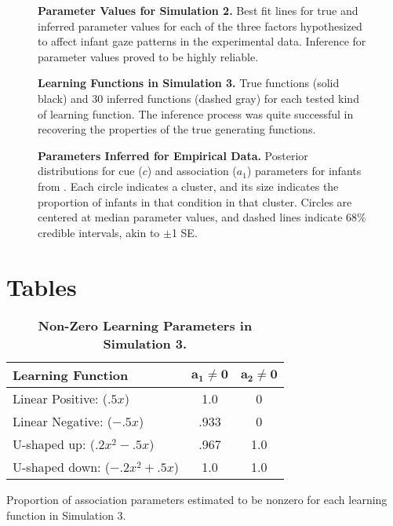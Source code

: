 \documentclass[12pt]{article}
\begin{document}
\begin{figure}[!h]
\caption{\textbf{Parameter Values for Simulation 2.} Best fit lines for true and inferred parameter values for each of the three factors hypothesized to affect infant gaze patterns in the experimental data. Inference for parameter values proved to be highly reliable.}
\label{fig:sim2}
\end{figure}

\begin{figure}[!h]
\caption{\textbf{Learning Functions in Simulation 3.} True functions (solid black) and 30 inferred functions (dashed gray) for each tested kind of learning function. The inference process was quite successful in recovering the properties of the true generating functions.}
\label{fig:sim3}
\end{figure}

\begin{figure}[!h]
\caption{\textbf{Parameters Inferred for Empirical Data.} Posterior distributions for cue ($c$) and association ($a_{1}$) parameters for infants from \cite{Wu2010a}. Each circle indicates a cluster, and its size indicates the proportion of infants in that condition in that cluster. Circles are centered at median parameter values, and dashed lines indicate 68\% credible intervals, akin to $\pm$1 SE.}
\label{fig:exp}
\end{figure}


\clearpage
\section*{Tables}
\begin{table}[!ht]
	\caption{\textbf{Non-Zero Learning Parameters in Simulation 3.}}
	\center
	\begin{tabular}{l c c}
	\hline
	\textbf{Learning Function} & $\mathbf{a_{1} \neq 0}$ & $\mathbf{a_{2} \neq 0}$\\
	\hline
	Linear Positive: ($.5x$) & 1.0 & 0\\
	Linear Negative: ($-.5x$) & .933 & 0\\
	U-shaped up: ($.2x^{2}-.5x$) & .967 & 1.0\\
	U-shaped down: ($-.2x^{2} + .5x$) & 1.0 & 1.0\\
	\hline
\end{tabular}
\begin{flushleft} Proportion of association parameters estimated to be nonzero for each learning function in Simulation 3.
\end{flushleft}
\label{tab:type_errs}
\end{table}
\end{document}

